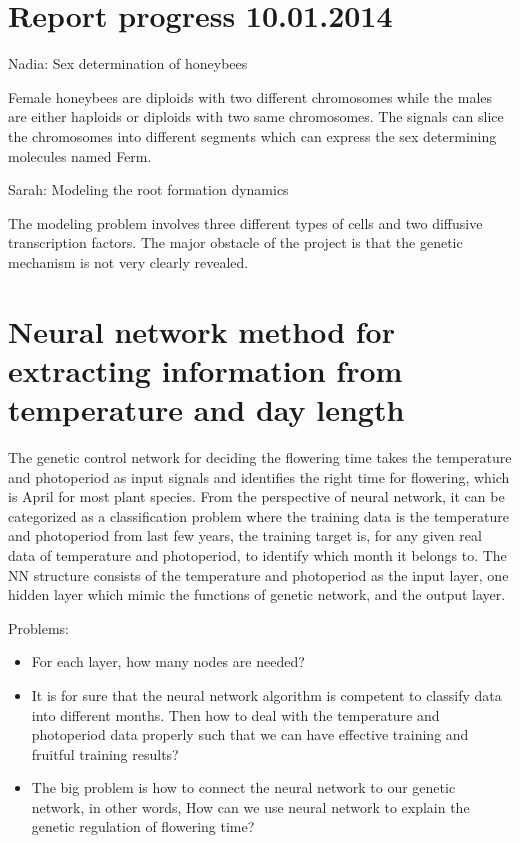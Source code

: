 \documentclass[paper=a4, fontsize=12pt]{scrartcl}	%
\numberwithin{equation}{section}					%
\numberwithin{figure}{section}					%
\numberwithin{table}{section}					%
\begin{document}
\section{Report progress 10.01.2014}

Nadia: Sex determination of honeybees

Female honeybees are diploids with two different chromosomes while the males are either haploids or diploids with two same chromosomes. The signals can slice the chromosomes into different segments which can express the sex determining molecules named Ferm. 

Sarah: Modeling the root formation dynamics

The modeling problem involves three different types of cells and two diffusive transcription factors. The major obstacle of the project is that the genetic mechanism is not very clearly revealed. 


\section{Neural network method for extracting information from temperature and day length}
The genetic control network for deciding the flowering time takes the temperature and photoperiod as input signals and identifies the right time for flowering, which is April for most plant species. From the perspective of neural network, it can be categorized as a classification problem where the training data is the temperature and photoperiod from last few years, the training target is, for any given real data of temperature and photoperiod, to identify which month it belongs to. The NN structure consists of the temperature and photoperiod as the input layer, one hidden layer which mimic the functions of genetic network, and the output layer. 

Problems:
\begin{itemize}
\item For each layer, how many nodes are needed?
\item It is for sure that the neural network algorithm is competent to classify data into different months. Then how to deal with the temperature and photoperiod data properly such that we can have effective training and fruitful training results?
\item The big problem is how to connect the neural network to our genetic network, in other words, How can we use neural network to explain the genetic regulation of flowering time?
\end{itemize}
\end{document}
